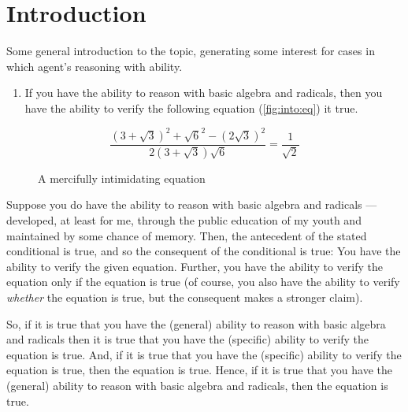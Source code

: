 \chapter{Introduction}
\label{cha:introduction}


\begin{note}
  \color{red}
  Some general introduction to the topic, generating some interest for cases in which agent's reasoning with ability.
\end{note}

\begin{note}
  \begin{enumerate}[label=(E\arabic*), ref=(E\arabic*), series=i_ex]
  \item\label{intro:ex:algebra} If you have the ability to reason with basic algebra and radicals, then you have the ability to verify the following equation (\autoref{fig:into:eq}) it true.
  \end{enumerate}

  \begin{figure}[H]
    \[\frac{(3 + \sqrt{3})^{2} + \sqrt{6}^{2} - (2\sqrt{3})^{2}}{2(3 + \sqrt{3})\sqrt{6}} = \frac{1}{\sqrt{2}}\]
    \caption{A mercifully intimidating equation}
    \label{fig:into:eq}
  \end{figure}

  Suppose you do have the ability to reason with basic algebra and radicals --- developed, at least for me, through the public education of my youth and maintained by some chance of memory.
  Then, the antecedent of the stated conditional is true, and so the consequent of the conditional is true:
  You have the ability to verify the given equation.
  Further, you have the ability to verify the equation only if the equation is true (of course, you also have the ability to verify \emph{whether} the equation is true, but the consequent makes a stronger claim).

  So, if it is true that you have the (general) ability to reason with basic algebra and radicals then it is true that you have the (specific) ability to verify the equation is true.
  And, if it is true that you have the (specific) ability to verify the equation is true, then the equation is true.
  Hence, if it is true that you have the (general) ability to reason with basic algebra and radicals, then the equation is true.


\end{note}
